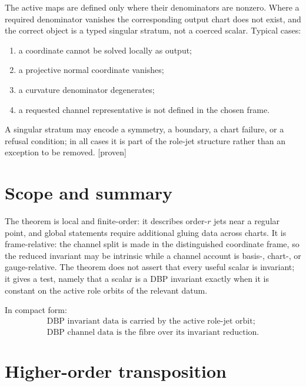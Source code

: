 \documentclass[11pt]{article}
\newcommand{\Proven}{\textsf{[proven]}}
\theoremstyle{plain}
\theoremstyle{definition}
\begin{document}
The active maps are defined only where their denominators are nonzero. Where a required denominator
vanishes the corresponding output chart does not exist, and the correct object is a typed singular
stratum, not a coerced scalar. Typical cases:
\begin{enumerate}[itemsep=1pt,topsep=2pt]
\item a coordinate cannot be solved locally as output;
\item a projective normal coordinate vanishes;
\item a curvature denominator degenerates;
\item a requested channel representative is not defined in the chosen frame.
\end{enumerate}
A singular stratum may encode a symmetry, a boundary, a chart failure, or a refusal condition; in all
cases it is part of the role-jet structure rather than an exception to be removed. \Proven

\section{Scope and summary}
\label{sec:scope}

The theorem is local and finite-order: it describes order-$r$ jets near a regular point, and global
statements require additional gluing data across charts. It is frame-relative: the channel split is
made in the distinguished coordinate frame, so the reduced invariant may be intrinsic while a channel
account is basis-, chart-, or gauge-relative. The theorem does not assert that every useful scalar is
invariant; it gives a test, namely that a scalar is a DBP invariant exactly when it is constant on the
active role orbits of the relevant datum.

\medskip
\noindent In compact form:
\[
\boxed{\;
\begin{gathered}
\text{DBP invariant data is carried by the active role-jet orbit;}\\
\text{DBP channel data is the fibre over its invariant reduction.}
\end{gathered}\;}
\]

\appendix
\section{Higher-order transposition}
\label{app:higher}
\end{document}

